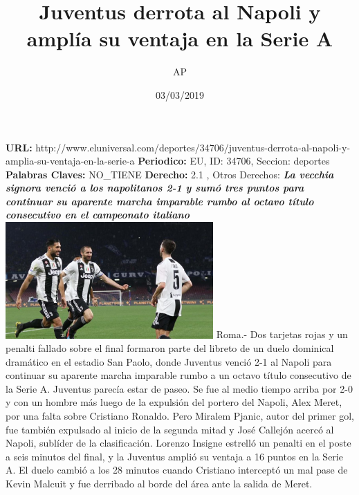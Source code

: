 \documentclass{article}%
\title{\textbf{Juventus derrota al Napoli y amplía su ventaja en la Serie A}}%
\author{AP}%
\date{03/03/2019}%
\begin{document}
%
\normalsize%
\maketitle%
\textbf{URL: }%
http://www.eluniversal.com/deportes/34706/juventus{-}derrota{-}al{-}napoli{-}y{-}amplia{-}su{-}ventaja{-}en{-}la{-}serie{-}a\newline%
%
\textbf{Periodico: }%
EU, %
ID: %
34706, %
Seccion: %
deportes\newline%
%
\textbf{Palabras Claves: }%
NO\_TIENE\newline%
%
\textbf{Derecho: }%
2.1%
, Otros Derechos: %
\newline%
%
\textbf{\textit{La vecchia signora venció a los napolitanos 2{-}1 y sumó tres puntos para continuar su aparente marcha imparable rumbo al octavo título consecutivo en el campeonato italiano}}%
\newline%
\newline%
%
\includegraphics[width=300px]{EU_34706.jpg}%
\newline%
%
Roma.{-} Dos tarjetas rojas y un penalti fallado sobre el final formaron parte del libreto de un duelo dominical dramático en el estadio San Paolo, donde Juventus venció 2{-}1 al Napoli para continuar su aparente marcha imparable rumbo a un octavo título consecutivo de la Serie A.%
\newline%
%
Juventus parecía estar de paseo. Se fue al medio tiempo arriba por 2{-}0 y con un hombre más luego de la expulsión del portero del Napoli, Alex Meret, por una falta sobre Cristiano Ronaldo.%
\newline%
%
Pero Miralem Pjanic, autor del primer gol, fue también expulsado al inicio de la segunda mitad y José Callejón acercó al Napoli, sublíder de la clasificación.%
\newline%
%
Lorenzo Insigne estrelló un penalti en el poste a seis minutos del final, y la Juventus amplió su ventaja a 16 puntos en la Serie A.%
\newline%
%
El duelo cambió a los 28 minutos cuando Cristiano interceptó un mal pase de Kevin Malcuit y fue derribado al borde del área ante la salida de Meret.%
\end{document}
